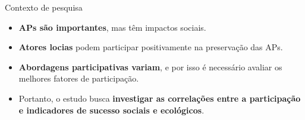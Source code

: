 \begin{frame}{Contexto de pesquisa}
\begin{itemize}
    \item \textbf{APs são importantes}, mas têm impactos sociais.
    \item \textbf{Atores locias} podem participar positivamente na preservação das APs.
    \item \textbf{Abordagens participativas variam}, e por isso é necessário avaliar os melhores fatores de participação.
    \item Portanto, o estudo busca \textbf{investigar as correlações entre a participação e indicadores de sucesso sociais e ecológicos}.
\end{itemize}
\end{frame}
